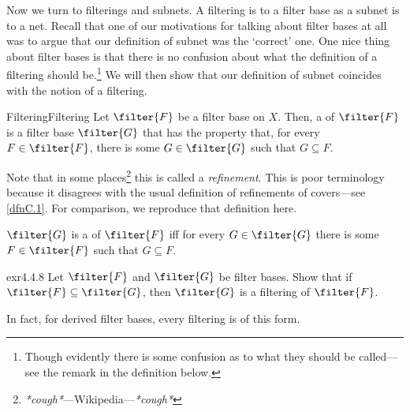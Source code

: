 Now we turn to filterings and subnets.  A filtering is to a filter base as a subnet is to a net.  Recall that one of our motivations for talking about filter bases at all was to argue that our definition of subnet was the `correct' one.  One nice thing about filter bases is that there is no confusion about what the definition of a filtering should be.\footnote{Though evidently there is some confusion as to what they should be called---see the remark in the definition below.}  We will then show that our definition of subnet coincides with the notion of a filtering.
\begin{dfn}{Filtering}{Filtering}
Let $\filter{F}$ be a filter base on $X$.  Then, a  of $\filter{F}$ is a filter base $\filter{G}$ that has the property that, for every $F\in \filter{F}$, there is some $G\in \filter{G}$ such that $G\subseteq F$.
\begin{rmk}
Note that in some places\footnote{\emph{*cough*}---Wikipedia---\emph{*cough*}} this is called a \emph{refinement}.  This is poor terminology because it disagrees with the usual definition of refinements of covers---see \cref{dfnC.1}.  For comparison, we reproduce that definition here.
\begin{textequation}
$\filter{G}$ is a  of $\filter{F}$ iff for every $G\in \filter{G}$ there is some $F\in \filter{F}$ such that $G\subseteq F$.
\end{textequation}
\end{rmk}
\end{dfn}
\begin{exr}{}{exr4.4.8}
Let $\filter{F}$ and $\filter{G}$ be filter bases.  Show that if $\filter{F}\subseteq \filter{G}$, then $\filter{G}$ is a filtering of $\filter{F}$.
\end{exr}
In fact, for derived filter bases, every filtering is of this form.
